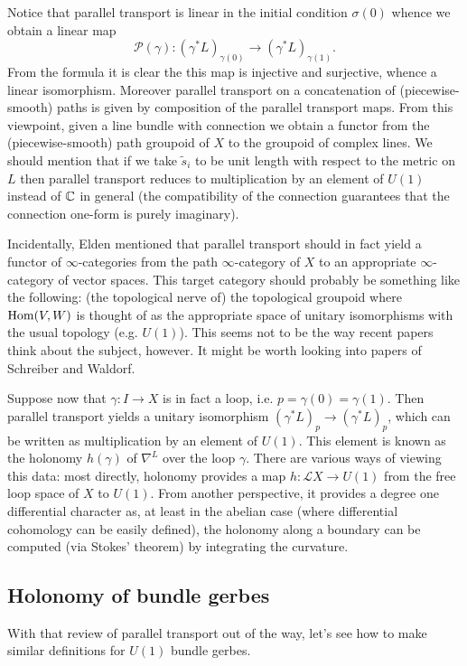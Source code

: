 \documentclass{amsart}
\begin{document}
Notice that parallel transport is linear in the initial condition $\sigma(0)$
whence we obtain a linear map
\begin{equation*}
    \mathcal{P}(\gamma): (\gamma^*L)_{\gamma(0)} \to (\gamma^*L)_{\gamma(1)}.
\end{equation*}
From the formula it is clear the this map is injective and surjective, whence
a linear isomorphism. Moreover parallel transport on a concatenation of (piecewise-smooth)
paths is given by composition of the parallel transport maps. From this viewpoint,
given a line bundle with connection we obtain a functor from the (piecewise-smooth)
path groupoid of $X$ to the groupoid of complex lines.
We should mention that if we take $\tilde s_i$ to be unit length with respect
to the metric on $L$ then parallel transport reduces to multiplication by
an element of $U(1)$ instead of $\mathbb{C}$ in general (the compatibility of the connection
guarantees that the connection one-form is purely imaginary).

Incidentally, Elden mentioned that parallel transport should in fact yield
a functor of $\infty$-categories from the path $\infty$-category of $X$ to
an appropriate $\infty$-category of vector spaces. This target category should
probably be something like the following: (the topological nerve of) the
topological groupoid where $\operatorname{Hom}(V,W)$ is thought of as the appropriate space of
unitary isomorphisms with the usual topology (e.g. $U(1)$). This seems not
to be the way recent papers think about the subject, however. It might be
worth looking into papers of Schreiber and Waldorf.

Suppose now that $\gamma:I\to X$ is in fact a loop, i.e. $p=\gamma(0)=\gamma(1)$.
Then parallel transport yields a unitary isomorphism $(\gamma^*L)_p\to(\gamma^*L)_p$,
which can be written as multiplication by an element of $U(1)$. This element is
known as the holonomy $h(\gamma)$ of $\nabla^L$ over the loop $\gamma$. There are various ways
of viewing this data: most directly, holonomy provides a map $h:\mathcal{L}X\to U(1)$
from the free loop space of $X$ to $U(1)$.  From another perspective, it provides a degree one differential character
as, at least in the abelian case (where differential cohomology can be easily defined),
the holonomy along a boundary can be computed (via Stokes' theorem) by integrating
the curvature.

\subsection{Holonomy of bundle gerbes}

With that review of parallel transport out of the way, let's see how to make
similar definitions for $U(1)$ bundle gerbes.


%
%
\end{document}
